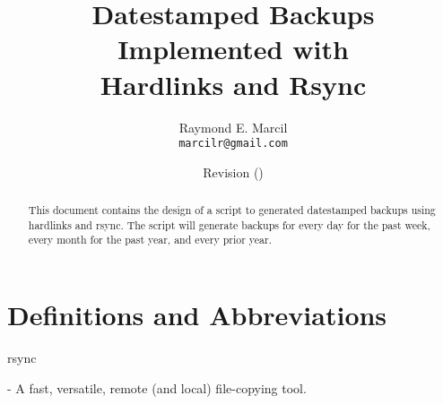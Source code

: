 \documentclass[12pt,letterpaper,dvips]{article}
\title{Datestamped Backups\\
       Implemented with\\
       Hardlinks and Rsync}
\author{Raymond E. Marcil\\
        \texttt{marcilr@gmail.com}
}
\date{Revision \svnInfoRevision
      \hspace{2pt}
      (\svnInfoLongDate)}
\newenvironment{itemize*}%
  {\begin{itemize}%
    \setlength{\itemsep}{0pt}%
    \setlength{\parsep}{0pt}}%
  {\end{itemize}}
\begin{document}
\maketitle

\begin{abstract}
  This document contains the design of a script to generated datestamped backups using hardlinks
  and rsync.  The script will generate backups for every day for the
  past week, every month for the past year, and every prior year.

\end{abstract}

\vspace{2.0in}



\newpage


\tableofcontents

\newpage
\listoffigures
\listoftables


\newpage

\section*{Definitions and Abbreviations}
\begin{itemize*}
  \item{\begin{bf}rsync\end{bf}} - A fast, versatile, remote (and local) file-copying tool.
\end{itemize*}
\end{document}
